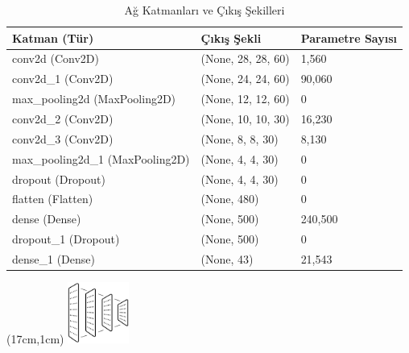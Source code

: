 \documentclass{article}
\begin{document}
\begin{table}[htbp]
\centering
\caption{Ağ Katmanları ve Çıkış Şekilleri}
\begin{tabular}{|l|l|l|}
\hline
\textbf{Katman (Tür)}           & \textbf{Çıkış Şekli} & \textbf{Parametre Sayısı} \\ \hline
conv2d (Conv2D)                 & (None, 28, 28, 60)   & 1,560                     \\ \hline
conv2d\_1 (Conv2D)              & (None, 24, 24, 60)   & 90,060                    \\ \hline
max\_pooling2d (MaxPooling2D)   & (None, 12, 12, 60)   & 0                         \\ \hline
conv2d\_2 (Conv2D)              & (None, 10, 10, 30)   & 16,230                    \\ \hline
conv2d\_3 (Conv2D)              & (None, 8, 8, 30)     & 8,130                     \\ \hline
max\_pooling2d\_1 (MaxPooling2D) & (None, 4, 4, 30)     & 0                         \\ \hline
dropout (Dropout)               & (None, 4, 4, 30)     & 0                         \\ \hline
flatten (Flatten)               & (None, 480)          & 0                         \\ \hline
dense (Dense)                   & (None, 500)          & 240,500                   \\ \hline
dropout\_1 (Dropout)             & (None, 500)          & 0                         \\ \hline
dense\_1 (Dense)                 & (None, 43)           & 21,543                    \\ \hline
\end{tabular}
\label{tab:network_layers}
\end{table}
\newpage
\begin{textblock*}{5cm}(17cm,1cm) %
    \includegraphics[width=2cm]{image/Resim45.png} %
\end{textblock*}
\end{document}
